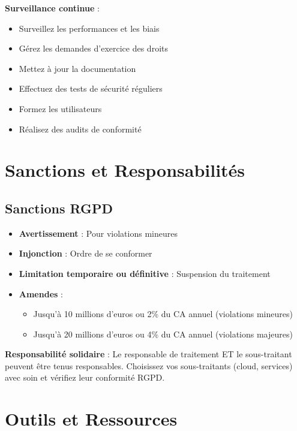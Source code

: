 \documentclass[11pt,a4paper]{article}
\begin{document}
\begin{tipbox}
\textbf{Surveillance continue} :
\begin{itemize}
    \item Surveillez les performances et les biais
    \item Gérez les demandes d'exercice des droits
    \item Mettez à jour la documentation
    \item Effectuez des tests de sécurité réguliers
    \item Formez les utilisateurs
    \item Réalisez des audits de conformité
\end{itemize}
\end{tipbox}

\section{Sanctions et Responsabilités}

\subsection{Sanctions RGPD}

\begin{itemize}
    \item \textbf{Avertissement} : Pour violations mineures
    \item \textbf{Injonction} : Ordre de se conformer
    \item \textbf{Limitation temporaire ou définitive} : Suspension du traitement
    \item \textbf{Amendes} : 
    \begin{itemize}
        \item Jusqu'à 10 millions d'euros ou 2\% du CA annuel (violations mineures)
        \item Jusqu'à 20 millions d'euros ou 4\% du CA annuel (violations majeures)
    \end{itemize}
\end{itemize}

\begin{importantbox}
\textbf{Responsabilité solidaire} : Le responsable de traitement ET le sous-traitant peuvent être tenus responsables. Choisissez vos sous-traitants (cloud, services) avec soin et vérifiez leur conformité RGPD.
\end{importantbox}

\section{Outils et Ressources}
\end{document}
